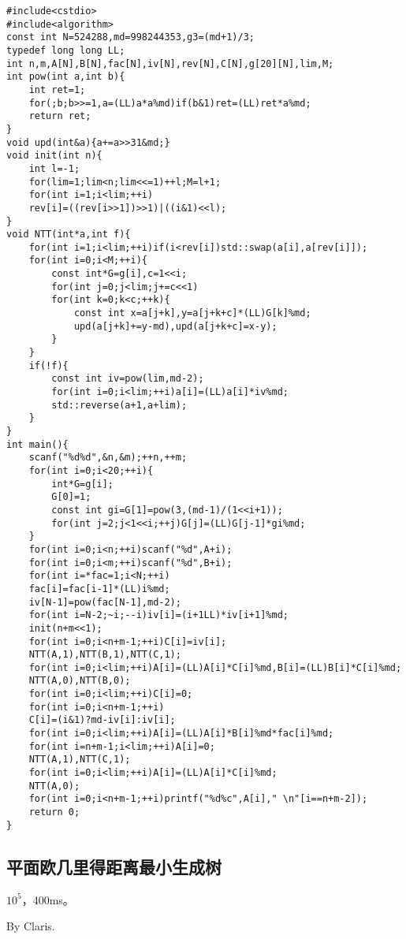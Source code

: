 \documentclass[12pt]{ctexart}
\begin{document}
\begin{lstlisting}
#include<cstdio>
#include<algorithm>
const int N=524288,md=998244353,g3=(md+1)/3;
typedef long long LL;
int n,m,A[N],B[N],fac[N],iv[N],rev[N],C[N],g[20][N],lim,M;
int pow(int a,int b){
    int ret=1;
    for(;b;b>>=1,a=(LL)a*a%md)if(b&1)ret=(LL)ret*a%md;
    return ret;
}
void upd(int&a){a+=a>>31&md;}
void init(int n){
    int l=-1;
    for(lim=1;lim<n;lim<<=1)++l;M=l+1;
    for(int i=1;i<lim;++i)
    rev[i]=((rev[i>>1])>>1)|((i&1)<<l);
}
void NTT(int*a,int f){
    for(int i=1;i<lim;++i)if(i<rev[i])std::swap(a[i],a[rev[i]]);
    for(int i=0;i<M;++i){
        const int*G=g[i],c=1<<i;
        for(int j=0;j<lim;j+=c<<1)
        for(int k=0;k<c;++k){
            const int x=a[j+k],y=a[j+k+c]*(LL)G[k]%md;
            upd(a[j+k]+=y-md),upd(a[j+k+c]=x-y);
        }
    }
    if(!f){
        const int iv=pow(lim,md-2);
        for(int i=0;i<lim;++i)a[i]=(LL)a[i]*iv%md;
        std::reverse(a+1,a+lim);
    }
}
int main(){
    scanf("%d%d",&n,&m);++n,++m;
    for(int i=0;i<20;++i){
        int*G=g[i];
        G[0]=1;
        const int gi=G[1]=pow(3,(md-1)/(1<<i+1));
        for(int j=2;j<1<<i;++j)G[j]=(LL)G[j-1]*gi%md;
    }
    for(int i=0;i<n;++i)scanf("%d",A+i);
    for(int i=0;i<m;++i)scanf("%d",B+i);
    for(int i=*fac=1;i<N;++i)
    fac[i]=fac[i-1]*(LL)i%md;
    iv[N-1]=pow(fac[N-1],md-2);
    for(int i=N-2;~i;--i)iv[i]=(i+1LL)*iv[i+1]%md;
    init(n+m<<1);
    for(int i=0;i<n+m-1;++i)C[i]=iv[i];
    NTT(A,1),NTT(B,1),NTT(C,1);
    for(int i=0;i<lim;++i)A[i]=(LL)A[i]*C[i]%md,B[i]=(LL)B[i]*C[i]%md;
    NTT(A,0),NTT(B,0);
    for(int i=0;i<lim;++i)C[i]=0;
    for(int i=0;i<n+m-1;++i)
    C[i]=(i&1)?md-iv[i]:iv[i];
    for(int i=0;i<lim;++i)A[i]=(LL)A[i]*B[i]%md*fac[i]%md;
    for(int i=n+m-1;i<lim;++i)A[i]=0;
    NTT(A,1),NTT(C,1);
    for(int i=0;i<lim;++i)A[i]=(LL)A[i]*C[i]%md;
    NTT(A,0);
    for(int i=0;i<n+m-1;++i)printf("%d%c",A[i]," \n"[i==n+m-2]);
    return 0;
}
\end{lstlisting}

\subsection{平面欧几里得距离最小生成树}

$10^5$，400ms。

By Claris.
\end{document}
